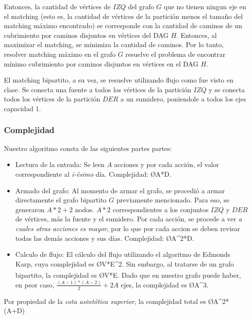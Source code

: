 Entonces, la cantidad de vértices de $IZQ$ del grafo $G$ que no tienen ningun eje en el matching (esto es, la cantidad de vértices de la partición menos el tamaño del matching máximo encontrado) se corresponde con la cantidad de caminos de un cubrimiento por caminos disjuntos en vértices del DAG $H$. Entonces, al maximizar el matching, se minimiza la cantidad de caminos. Por lo tanto, resolver matching máximo en el grafo $G$ resuelve el problema de encontrar mínimo cubrimiento por caminos disjuntos en vértices en el DAG $H$.

El matching bipartito, a su vez, se resuelve utilizando flujo como fue visto en clase. Se conecta una fuente a todos los vértices de la partición $IZQ$ y se conecta todos los vértices de la partición $DER$ a un sumidero, poniendole a todos los ejes capacidad 1.

\subsubsection{Complejidad}
Nuestro algoritmo consta de las siguientes partes partes:
\begin{itemize}
	\item Lectura de la entrada: Se leen $A$ acciones y por cada acción, el valor correspondiente al \emph{i-ésimo} día. Complejidad: \O{A*D}.
	\item Armado del grafo: Al momento de armar el grafo, se procedió a armar directamente el grafo bipartito $G$ previamente mencionado. Para eso, se generaron $A*2+2$ nodos. $A*2$ correspondientes a los conjuntos $IZQ$ y $DER$ de vértices, más la fuente y el sumidero. Por cada acción, se procede a ver \emph{a cuales otras acciones es mayor}, por lo que por cada accion se deben revisar todas las demás acciones y sus días. Complejidad: \O{A^2*D}.
	\item Calculo de flujo: El cálculo del flujo utilizando el algoritmo de Edmonds Karp, cuya complejidad es \O{V*E^2}. Sin embargo, al tratarse de un grafo bipartito, la complejidad es \O{V*E}\textsuperscript{\cite{cormen}}. Dado que en nuestro grafo puede haber, en peor caso, $\frac{(A-1)*(A-2)}{2}+2A$ ejes, la complejidad es \O{A^3}.
\end{itemize}

Por propiedad de la \emph{cota asintótica superior}, la complejidad total es
\O{A^2*(A+D)}